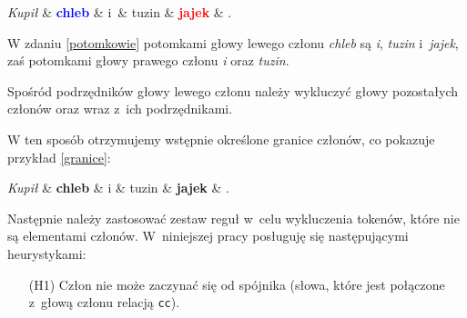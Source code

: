 \begin{exe}
\ex \label{potomkowie}
\begin{dependency}[baseline=-\the\dimexpr\fontdimen22\textfont2\relax]
\begin{deptext}[column sep=1em, row sep=.1ex]
\emph{Kupił} \& \textbf{\textcolor{blue}{chleb}} \& i~\& tuzin \& \textbf{\textcolor{red}{jajek}} \& .  \\ 
\end{deptext}
\end{dependency}
\end{exe}

W zdaniu \eqref{potomkowie} potomkami głowy lewego członu \textit{chleb} są \textit{i}, \textit{tuzin} i~\textit{jajek}, zaś potomkami głowy prawego członu \textit{i} oraz \textit{tuzin}.

Spośród podrzędników głowy lewego członu należy wykluczyć głowy pozostałych członów oraz wraz z~ich podrzędnikami.

W ten sposób otrzymujemy wstępnie określone granice członów, co pokazuje przykład \eqref{granice}:

\begin{exe}
\ex \label{granice}
\begin{dependency}[baseline=-\the\dimexpr\fontdimen22\textfont2\relax]
\begin{deptext}[column sep=1em, row sep=.1ex]
\emph{Kupił} \& \textbf{chleb} \& i \& tuzin \& \textbf{jajek} \& .  \\ 
\end{deptext}
\end{dependency}
\end{exe}

Następnie należy zastosować zestaw reguł w~celu wykluczenia tokenów, które nie są elementami członów. W~niniejszej pracy posługuję się następującymi heurystykami:

\begin{enumerate}
\item[(H1)] Człon nie może zaczynać się od spójnika (słowa, które jest połączone z~głową członu relacją \texttt{cc}).
\end{enumerate}

